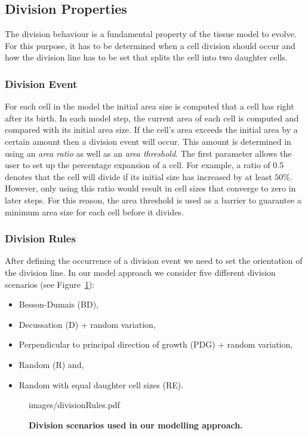\documentclass[11pt,a4paper, draft]{article}
\newenvironment{Itemize}{
  \begin{itemize}[leftmargin=0.5cm]{
}}{\end{itemize}}
\begin{document}
\subsection{Division Properties}
\noindent
The division behaviour is a fundamental property of the tissue model to evolve. For this purpose, it has to be determined when a cell division should occur and how the division line has to be set that splits the cell into two daughter cells.

\subsubsection{Division Event}
\noindent
For each cell in the model the initial area size is computed that a cell has right after its birth. In each model step, the current area of each cell is computed and compared with its initial area size. If the cell's area exceeds the initial area by a certain amount then a division event will occur. This amount is determined in using an \textit{area ratio} as well as an \textit{area threshold}. The first parameter allows the user to set up the percentage expansion of a cell. For example, a ratio of $0.5$ denotes that the cell will divide if its initial size has increased by at least $50\%$. However, only using this ratio would result in cell sizes that converge to zero in later steps. For this reason, the area threshold is used as a barrier to guarantee a minimum area size for each cell before it divides.

\subsubsection{Division Rules}
\label{sec:divisionRules}
\noindent
After defining the occurrence of a division event we need to set the orientation of the division line. In our model approach we consider five different division scenarios (see Figure~\ref{fig:divisionRules}):
\begin{Itemize}
\item Besson-Dumais (BD),
\item Decussation (D) + random variation,
\item Perpendicular to principal direction of growth (PDG) + random variation,
\item Random (R) and,
\item Random with equal daughter cell sizes (RE).
\end{Itemize}
%
\begin{figure}[htbp]
	\begin{center}
		\begin{overpic}[width=1.\linewidth]{images/divisionRules.pdf}
		\end{overpic}
\caption[Division scenarios used in our modelling approach.]
{
{\bf Division scenarios used in our modelling approach.}
}
	\label{fig:divisionRules}
	\end{center}
\end{figure}
%
\end{document}
